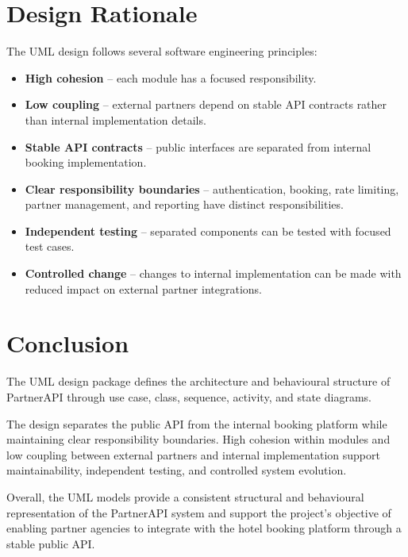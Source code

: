 \documentclass[12pt,a4paper]{article}
\begin{document}

\section{Design Rationale}

The UML design follows several software engineering principles:

\begin{itemize}
    \item \textbf{High cohesion} -- each module has a focused
    responsibility.
    \item \textbf{Low coupling} -- external partners depend on stable
    API contracts rather than internal implementation details.
    \item \textbf{Stable API contracts} -- public interfaces are
    separated from internal booking implementation.
    \item \textbf{Clear responsibility boundaries} -- authentication,
    booking, rate limiting, partner management, and reporting have
    distinct responsibilities.
    \item \textbf{Independent testing} -- separated components can be
    tested with focused test cases.
    \item \textbf{Controlled change} -- changes to internal
    implementation can be made with reduced impact on external
    partner integrations.
\end{itemize}


\section{Conclusion}

The UML design package defines the architecture and behavioural
structure of PartnerAPI through use case, class, sequence, activity,
and state diagrams.

The design separates the public API from the internal booking
platform while maintaining clear responsibility boundaries. High
cohesion within modules and low coupling between external partners
and internal implementation support maintainability, independent
testing, and controlled system evolution.

Overall, the UML models provide a consistent structural and
behavioural representation of the PartnerAPI system and support the
project's objective of enabling partner agencies to integrate with
the hotel booking platform through a stable public API.
\end{document}
